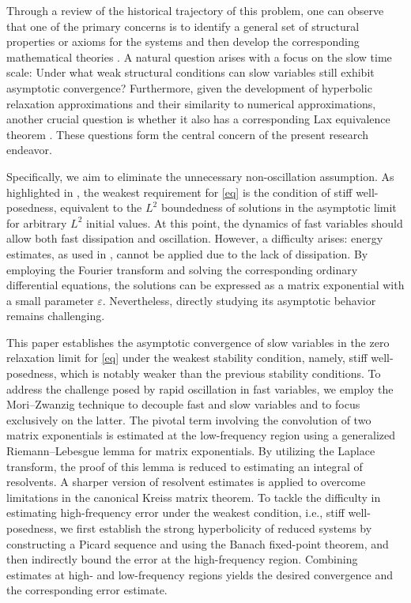 \documentclass{article}
\theoremstyle{plain}%
\theoremstyle{definition}%
\theoremstyle{remark}%
\newcommand{\+}[1]{{\bm{#1}}}
\newcommand{\eps}{\varepsilon}
\begin{document}
Through a review of the historical trajectory of this problem, one 
can observe that one of the primary concerns 
is to identify a general set of structural properties or axioms for 
the systems and then develop the corresponding mathematical theories 
\cite{Yong2008interesting}. 
A natural question arises with a focus on the slow time scale: 
Under what weak structural conditions can slow variables still 
exhibit asymptotic convergence? 
Furthermore, given the development of hyperbolic relaxation 
approximations \cite{JinXin1995relaxation,Natalini1996Convergence} 
and their similarity to numerical approximations, another crucial 
question is whether it also has a corresponding Lax equivalence 
theorem \cite{Lax1956Survey}.
These questions form the central concern of the present 
research endeavor.

Specifically, we aim to eliminate the unnecessary non-oscillation 
assumption. 
As highlighted in \cite{Yong_basic_2002}, the weakest requirement for 
\cref{eq} is the condition of stiff well-posedness, equivalent to 
the $L^2$ boundedness of solutions in the asymptotic limit 
for arbitrary $L^2$ initial values.
At this point, the dynamics of fast variables should allow both 
fast dissipation and oscillation. 
However, a difficulty arises: energy estimates, as used in 
\cite{Yong_singular_1999}, cannot be applied due to the lack of 
dissipation. 
By employing the Fourier transform and solving the corresponding 
ordinary differential equations, the solutions can be 
expressed as a matrix exponential with a small parameter $\eps$. 
Nevertheless, directly studying its asymptotic behavior remains 
challenging.

This paper establishes the asymptotic convergence of slow 
variables in the zero relaxation limit for \cref{eq} under 
the weakest stability condition, namely, stiff well-posedness, 
which is notably weaker than the previous stability conditions.
To address the challenge posed by rapid oscillation in fast 
variables, we employ the Mori--Zwanzig technique 
\cite{E2011Principles,mori1965transport,zwanzig1960collision} 
to decouple fast and 
slow variables and to focus exclusively on the latter. 
The pivotal term involving the convolution of two matrix exponentials 
is estimated at the low-frequency region using a generalized 
Riemann--Lebesgue lemma for matrix exponentials.
By utilizing the Laplace transform, the proof of this lemma is 
reduced to estimating an integral of resolvents. 
A sharper version of resolvent estimates is applied to overcome 
limitations in the canonical Kreiss matrix theorem. 
To tackle the difficulty in estimating high-frequency 
error under the weakest condition, i.e., stiff well-posedness, we 
first establish the strong hyperbolicity of reduced systems by 
constructing 
a Picard sequence and using the Banach fixed-point theorem, and then 
indirectly bound the error at the high-frequency region.
Combining estimates at high- and low-frequency regions yields the 
desired convergence and the corresponding error estimate.
\end{document}
